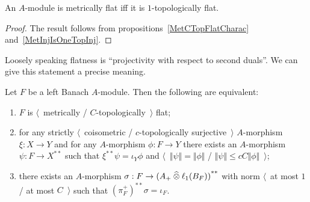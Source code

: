\begin{proposition}\label{MetFlatIsOneTopFlat} An $A$-module is metrically flat
iff it is $1$-topologically flat.
\end{proposition}
\begin{proof} The result follows from propositions~\ref{MetCTopFlatCharac}
and~\ref{MetInjIsOneTopInj}.
\end{proof}

Loosely speaking flatness is ``projectivity with respect to second duals''. 
We can give this statement a precise meaning.

\begin{proposition}\label{MetTopFlatSecondDualCharac} Let $F$ be a left Banach
$A$-module. Then the following are equivalent:

\begin{enumerate}[label = (\roman*)]
    \item $F$ is $\langle$~metrically / $C$-topologically~$\rangle$ flat;

    \item for any strictly $\langle$~coisometric / $c$-topologically
    surjective~$\rangle$ $A$-morphism $\xi:X\to Y$ and for any $A$-morphism
    $\phi:F\to Y$ there exists an $A$-morphism $\psi:F\to X^{**}$ such that
    $\xi^{**}\psi=\iota_Y\phi$ and $\langle$~$\Vert\psi\Vert=\Vert\phi\Vert$ /
    $\Vert\psi\Vert\leq cC\Vert\phi\Vert$~$\rangle$;

    \item there exists an $A$-morphism $\sigma:F\to {(A_+\mathbin{\widehat{\otimes}}\ell_1(B_F))}^{**}$ with norm $\langle$~at most $1$ / at most $C$~$\rangle$
    such that ${(\pi_F^+)}^{**}\sigma=\iota_F$.
\end{enumerate}
\end{proposition}
